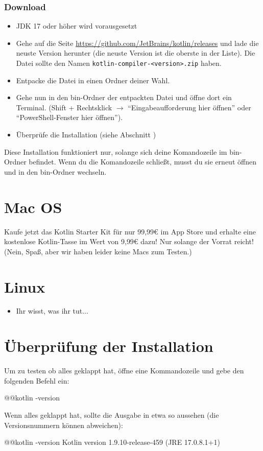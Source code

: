 \subsubsection*{Download}
\begin{itemize}
    \item JDK 17 oder höher wird vorausgesetzt
    \item Gehe auf die Seite \url{https://github.com/JetBrains/kotlin/releases} und lade die neuste Version herunter (die neuste Version ist die oberste in der Liste). Die Datei sollte den Namen \texttt{kotlin-compiler-<version>.zip} haben.
    \item Entpacke die Datei in einen Ordner deiner Wahl.
    \item Gehe nun in den bin-Ordner der entpackten Datei und öffne dort ein Terminal. (Shift + Rechtsklick $\rightarrow$ \enquote{Eingabeaufforderung hier öffnen} oder \enquote{PowerShell-Fenster hier öffnen}).
    \item Überprüfe die Installation (siehe Abschnitt )
\end{itemize}
\begin{hinweis}
    Diese Installation funktioniert nur, solange sich deine Komandozeile im bin-Ordner befindet. Wenn du die Komandozeile schließt, musst du sie erneut öffnen und in den bin-Ordner wechseln.
\end{hinweis}
\section*{Mac OS}
Kaufe jetzt das Kotlin Starter Kit für nur 99,99€ im App Store und erhalte eine kostenlose Kotlin-Tasse im Wert von 9,99€ dazu! Nur solange der Vorrat reicht! (Nein, Spaß, aber wir haben leider keine Macs zum Testen.)

\section*{Linux}
\begin{itemize}
    \item Ihr wisst, was ihr tut...
\end{itemize}

\section*{Überprüfung der Installation}\label{sec:check}
Um zu testen ob alles geklappt hat, öffne eine Kommandozeile und gebe den folgenden Befehl ein:
\begin{commandshell}
    @\shellprefix{}@kotlin -version
\end{commandshell}

Wenn alles geklappt hat, sollte die Ausgabe in etwa so aussehen (die Versionsnummern können abweichen):
\begin{commandshell}[][]
    @\shellprefix{}@kotlin -version
    Kotlin version 1.9.10-release-459 (JRE 17.0.8.1+1)
\end{commandshell}


